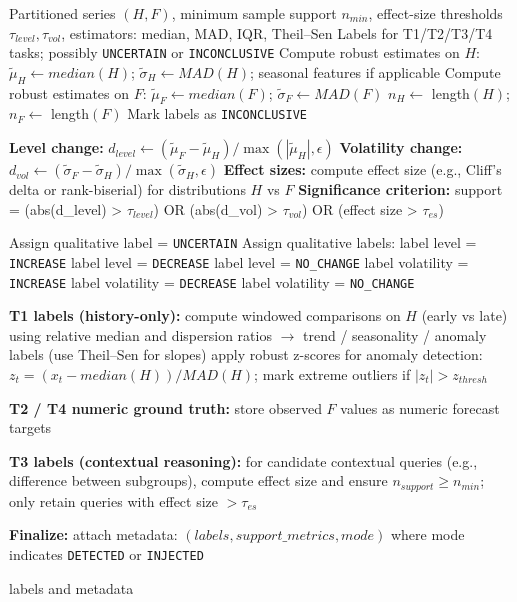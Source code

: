 \begin{algorithm}[H]
\caption{Rule-based Ground-Truth Labeling}
\label{alg:label_gen}
\begin{algorithmic}[1]
\REQUIRE Partitioned series $(H, F)$, minimum sample support $n_{min}$, effect-size thresholds $\tau_{level}, \tau_{vol}$, estimators: median, MAD, IQR, Theil--Sen
\ENSURE Labels for T1/T2/T3/T4 tasks; possibly \texttt{UNCERTAIN} or \texttt{INCONCLUSIVE}
\STATE Compute robust estimates on $H$: $\tilde{\mu}_H \leftarrow median(H)$; $\tilde{\sigma}_H \leftarrow MAD(H)$; seasonal features if applicable
\STATE Compute robust estimates on $F$: $\tilde{\mu}_F \leftarrow median(F)$; $\tilde{\sigma}_F \leftarrow MAD(F)$
\STATE $n_H \leftarrow$ length$(H)$; $n_F \leftarrow$ length$(F)$
    \STATE Mark labels as \texttt{INCONCLUSIVE}
    \RETURN
\ENDIF

\STATE \textbf{Level change:} $d_{level} \leftarrow (\tilde{\mu}_F - \tilde{\mu}_H)/\max(|\tilde{\mu}_H|, \epsilon)$
\STATE \textbf{Volatility change:} $d_{vol} \leftarrow (\tilde{\sigma}_F - \tilde{\sigma}_H)/\max(\tilde{\sigma}_H, \epsilon)$
\STATE \textbf{Effect sizes:} compute effect size (e.g., Cliff's delta or rank-biserial) for distributions $H$ vs $F$
\STATE \textbf{Significance criterion:} support = (abs(d_{level}) > $\tau_{level}$) OR (abs(d_{vol}) > $\tau_{vol}$) OR (effect size > $\tau_{es}$)

    \STATE Assign qualitative label = \texttt{UNCERTAIN}
\ELSE
    \STATE Assign qualitative labels:
     label level = \texttt{INCREASE}
     label level = \texttt{DECREASE}
    \ELSE label level = \texttt{NO\_CHANGE}
    \ENDIF
     label volatility = \texttt{INCREASE}
     label volatility = \texttt{DECREASE}
    \ELSE label volatility = \texttt{NO\_CHANGE}
    \ENDIF
\ENDIF

\STATE \textbf{T1 labels (history-only):}
\STATE compute windowed comparisons on $H$ (early vs late) using relative median and dispersion ratios $\to$ trend / seasonality / anomaly labels (use Theil--Sen for slopes)
\STATE apply robust z-scores for anomaly detection: $z_t = (x_t - median(H))/MAD(H)$; mark extreme outliers if $|z_t| > z_{thresh}$

\STATE \textbf{T2 / T4 numeric ground truth:} store observed $F$ values as numeric forecast targets

\STATE \textbf{T3 labels (contextual reasoning):}
\STATE for candidate contextual queries (e.g., difference between subgroups), compute effect size and ensure $n_{support} \ge n_{min}$; only retain queries with effect size $> \tau_{es}$

\STATE \textbf{Finalize:} attach metadata: $(labels, support\_metrics, mode)$ where mode indicates \texttt{DETECTED} or \texttt{INJECTED}

\RETURN labels and metadata
\end{algorithmic}
\end{algorithm}

